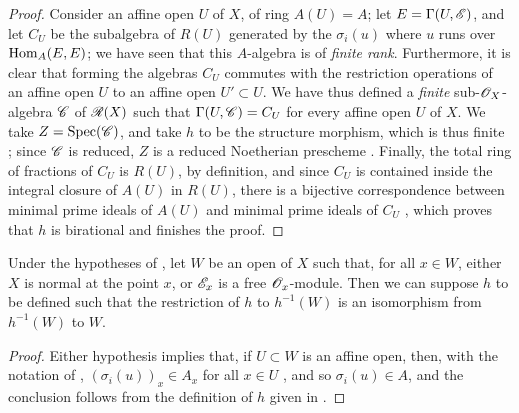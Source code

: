 \begin{proof}
Consider an affine open $U$ of $X$, of ring $A(U)=A$;
let $E=\Gamma(U,\mathscr{E})$, and let $C_U$ be the subalgebra of $R(U)$ generated by the $\sigma_i(u)$ where $u$ runs over $\operatorname{Hom}_A(E,E)$;
we have seen  that this $A$-algebra is of \emph{finite rank}.
Furthermore, it is clear that forming the algebras $C_U$ commutes with the restriction operations of an affine open $U$ to an affine open $U'\subset U$.
We have thus defined a \emph{finite} sub-$\mathscr{O}_X$-algebra $\mathscr{C}$ of $\mathscr{R}(X)$ such that $\Gamma(U,\mathscr{C})=C_U$ for every affine open $U$ of $X$.
We take $Z=\operatorname{Spec}(\mathscr{C})$, and take $h$ to be the structure morphism, which is thus finite ;
since $\mathscr{C}$ is reduced, $Z$ is a reduced Noetherian prescheme .
Finally, the total ring of fractions of $C_U$ is $R(U)$, by definition, and since $C_U$ is contained inside the integral closure of $A(U)$ in $R(U)$, there is a bijective correspondence between minimal prime ideals of $A(U)$ and minimal prime ideals of $C_U$ \cite[t.~I, p.~259]{I-13}, which proves that $h$ is birational and finishes the proof.
\end{proof}

\begin{corollary}[6.6.7]
\label{II.6.6.7}
Under the hypotheses of , let $W$ be an open of $X$ such that, for all $x\in W$, either $X$ is normal at the point $x$, or $\mathscr{E}_x$ is a free $\mathscr{O}_x$-module.
Then we can suppose $h$ to be defined such that the restriction of $h$ to $h^{-1}(W)$ is an isomorphism from $h^{-1}(W)$ to $W$.
\end{corollary}

\begin{proof}
Either hypothesis implies that, if $U\subset W$ is an affine open, then, with the notation of , $(\sigma_i(u))_x\in A_x$ for all $x\in U$ , and so $\sigma_i(u)\in A$, and the conclusion follows from the definition of $h$ given in .
\end{proof}

